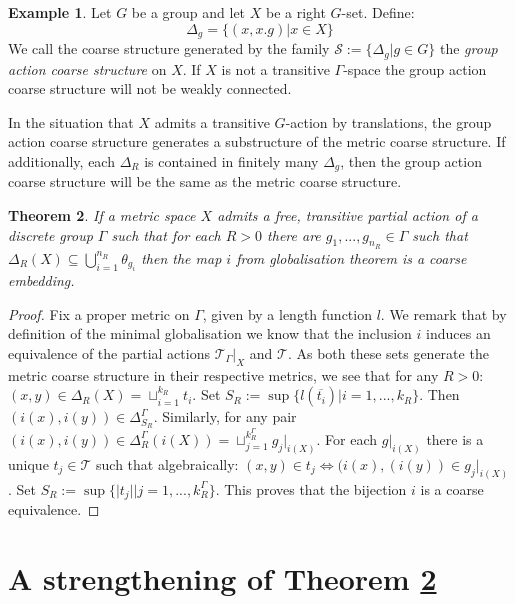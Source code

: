 \documentclass[11pt,a4paper]{amsart}
\theoremstyle{plain}
\newtheorem{theorem}{Theorem}%
\theoremstyle{definition}%
\newtheorem{example}[theorem]{Example}%
\theoremstyle{remark}%
\begin{document}
\begin{example}\label{ex:GACS}
Let $G$ be a group and let $X$ be a right $G$-set. Define:
\begin{equation*}
\Delta_{g}=\lbrace (x,x.g) | x \in X \rbrace  
\end{equation*}
We call the coarse structure generated by the family $\mathcal{S}:=\lbrace \Delta_{g} | g\in G\rbrace$ the \textit{group action coarse structure} on $X$. If $X$ is not a transitive $\Gamma$-space the group action coarse structure will not be weakly connected.
\end{example}

In the situation that $X$ admits a transitive $G$-action by translations, the group action coarse structure generates a substructure of the metric coarse structure. If additionally, each $\Delta_{R}$ is contained in finitely many $\Delta_{g}$, then the group action coarse structure will be the same as the metric coarse structure.

\begin{theorem}\label{Thm:Embedding}
If a metric space $X$ admits a free, transitive partial action of a discrete group $\Gamma$ such that for each $R>0$ there are $g_{1},...,g_{n_{R}} \in \Gamma$ such that $\Delta_{R}(X) \subseteq \bigcup_{i=1}^{n_{R}}\theta_{g_{i}}$ then the map $i$ from globalisation theorem is a coarse embedding.
\end{theorem}
\begin{proof}
Fix a proper metric on $\Gamma$, given by a length function $l$. We remark that by definition of the minimal globalisation we know that the inclusion $i$ induces an equivalence of the partial actions $\mathcal{T}_{\Gamma}|_{X}$ and $\mathcal{T}$. As both these sets generate the metric coarse structure in their respective metrics, we see that for any $R>0$: $(x,y)\in \Delta_{R}(X)=\sqcup_{i=1}^{k_{R}}t_{i}$. Set $S_{R}:=\sup \lbrace l(\overline{t_{i}}) | i=1,...,k_{R} \rbrace$. Then $(i(x),i(y))\in \Delta_{S_{R}}^{\Gamma}$. Similarly, for any pair $(i(x),i(y)) \in \Delta^{\Gamma}_{R}(i(X))=\sqcup_{j=1}^{k_{R}^{\Gamma}} g_{j}|_{i(X)}$. For each $g|_{i(X)}$ there is a unique $t_{j}\in \mathcal{T}$ such that algebraically: $(x,y)\in t_{j} \Leftrightarrow (i(x),(i(y)) \in g_{j}|_{i(X)}$. Set $S_{R}:=\sup \lbrace \vert t_{j} \vert | j=1,...,k_{R}^{\Gamma} \rbrace$. This proves that the bijection $i$ is a coarse equivalence. 
\end{proof}

\section{A strengthening of Theorem \ref{Thm:Embedding}}
\end{document}
